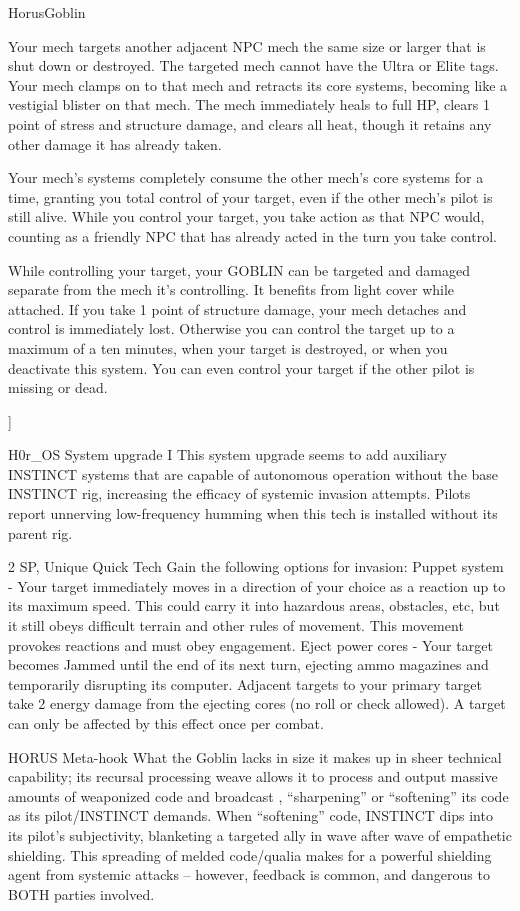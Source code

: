 \begin{mech}{Horus}{Goblin}
{Your mech targets another adjacent NPC mech the same size or larger that is shut down or destroyed. The targeted mech cannot have the Ultra or Elite tags. Your mech clamps on to that mech and retracts its core systems, becoming like a vestigial blister on that mech. The mech immediately heals to full HP, clears 1 point of stress and structure damage, and clears all heat, though it retains any other damage it has already taken.


Your mech’s systems completely consume the other mech’s core systems for a time, granting you total control of your target, even if the other mech’s pilot is still alive. While you control your target, you take action as that NPC would, counting as a friendly NPC that has already acted in the turn you take control.


While controlling your target, your GOBLIN can be targeted and damaged separate from the mech it’s controlling. It benefits from light cover while attached. If you take 1 point of structure damage, your mech detaches and control is immediately lost. Otherwise you can control the target up to a maximum of a ten minutes, when your target is destroyed, or when you deactivate this system. You can even control your target if the other pilot is missing or dead.
}]


H0r\_OS System upgrade I
This system upgrade seems to add auxiliary INSTINCT systems that are capable of autonomous operation without the base INSTINCT rig, increasing the efficacy of systemic invasion attempts. Pilots report unnerving low-frequency humming when this tech is installed without its parent rig.

2 SP, Unique
Quick Tech
Gain the following options for invasion:
Puppet system - Your target immediately moves in a direction of your choice as a reaction up to its maximum speed. This could carry it into hazardous areas, obstacles, etc, but it still obeys difficult terrain and other rules of movement. This movement provokes reactions and must obey engagement.
Eject power cores - Your target becomes Jammed until the end of its next turn, ejecting ammo magazines and temporarily disrupting its computer. Adjacent targets to your primary target take 2 energy damage from the ejecting cores (no roll or check allowed). A target can only be affected by this effect once per combat.

HORUS Meta-hook
What the Goblin lacks in size it makes up in sheer technical capability; its recursal processing weave allows it to process and output massive amounts of weaponized code and broadcast , “sharpening” or “softening” its code as its pilot/INSTINCT demands. When “softening” code, INSTINCT dips into its pilot’s subjectivity, blanketing a targeted ally in wave after wave of empathetic shielding. This spreading of melded code/qualia makes for a powerful shielding agent from systemic attacks -- however, feedback is common, and dangerous to BOTH parties involved. 


\end{mech}
